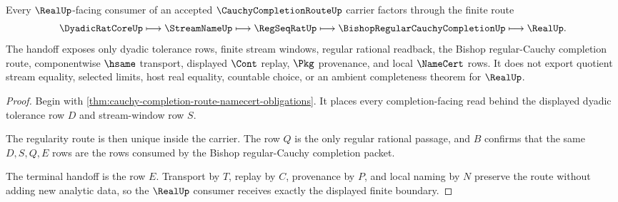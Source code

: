 \begin{theorem}
\label{thm:cauchy-completion-route-real-boundary}
Every $\RealUp$-facing consumer of an accepted $\CauchyCompletionRouteUp$ carrier factors through the finite route
$$
\DyadicRatCoreUp \longmapsto \StreamNameUp \longmapsto \RegSeqRatUp \longmapsto \BishopRegularCauchyCompletionUp \longmapsto \RealUp .
$$
The handoff exposes only dyadic tolerance rows, finite stream windows, regular rational readback, the Bishop regular-Cauchy completion route, componentwise $\hsame$ transport, displayed $\Cont$ replay, $\Pkg$ provenance, and local $\NameCert$ rows. It does not export quotient stream equality, selected limits, host real equality, countable choice, or an ambient completeness theorem for $\RealUp$.
\end{theorem}
\begin{proof}
Begin with \autoref{thm:cauchy-completion-route-namecert-obligations}. It places every completion-facing read behind the displayed dyadic tolerance row $D$ and stream-window row $S$.

The regularity route is then unique inside the carrier. The row $Q$ is the only regular rational passage, and $B$ confirms that the same $D,S,Q,E$ rows are the rows consumed by the Bishop regular-Cauchy completion packet.

The terminal handoff is the row $E$. Transport by $T$, replay by $C$, provenance by $P$, and local naming by $N$ preserve the route without adding new analytic data, so the $\RealUp$ consumer receives exactly the displayed finite boundary.
\end{proof}

\begin{closurestatus}{\CauchyCompletionRouteUp}
  \theoryclosure{\seedClosure}
  \formalstatus{\unformalizedV}
\end{closurestatus}
